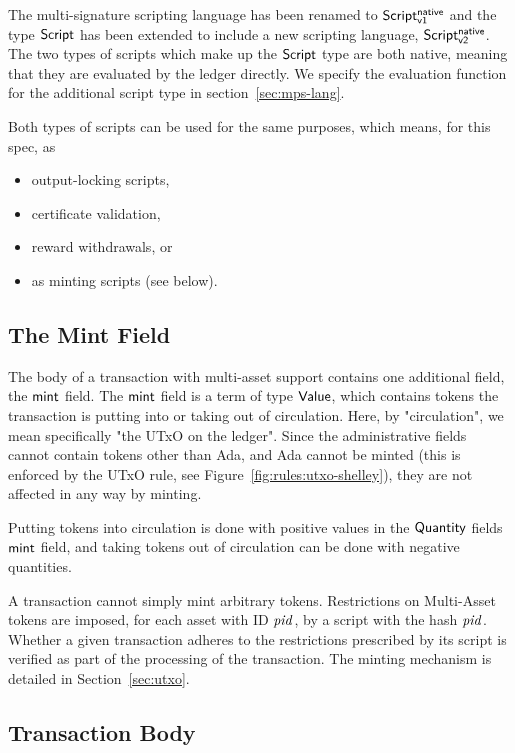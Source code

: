 The multi-signature scripting language has been renamed to $\mathsf{Script^{native}_{v1}}$ and
the type $\mathsf{Script}$ has been extended to include a new scripting language,
$\mathsf{Script^{native}_{v2}}$. The two types of scripts which make up the $\mathsf{Script}$ type are both
native, meaning
that they are evaluated by the ledger directly. We specify the evaluation
function for the additional script type in section~\ref{sec:mps-lang}.

Both types of scripts can be used for the same purposes, which means, for this
spec, as

\begin{itemize}
  \item output-locking scripts,
  \item certificate validation,
  \item reward withdrawals, or
  \item as minting scripts (see below).
\end{itemize}

\subsection*{The Mint Field}

The body of a transaction with multi-asset support contains one additional
field, the $\mathsf{mint}$ field.
The $\mathsf{mint}$ field is a term of type $\mathsf{Value}$, which contains
tokens the transaction is putting into or taking out of
circulation. Here, by "circulation", we mean specifically "the UTxO on the
ledger". Since the administrative fields cannot contain tokens other than Ada,
and Ada cannot be minted (this is enforced by the UTxO rule, see Figure~\ref{fig:rules:utxo-shelley}),
they are not affected in any way by minting.

Putting tokens into circulation is done with positive values in the $\mathsf{Quantity}$
fields $\mathsf{mint}$ field, and taking tokens out of circulation can be done
with negative quantities.

A transaction cannot simply mint arbitrary tokens. Restrictions on
Multi-Asset tokens are imposed, for each asset with ID $\mathit{pid}$, by a script
with the hash $\mathit{pid}$. Whether a given transaction adheres to the restrictions
prescribed by its script is verified as part of the processing of the transaction.
The minting mechanism is detailed in Section~\ref{sec:utxo}.

\subsection*{Transaction Body}

